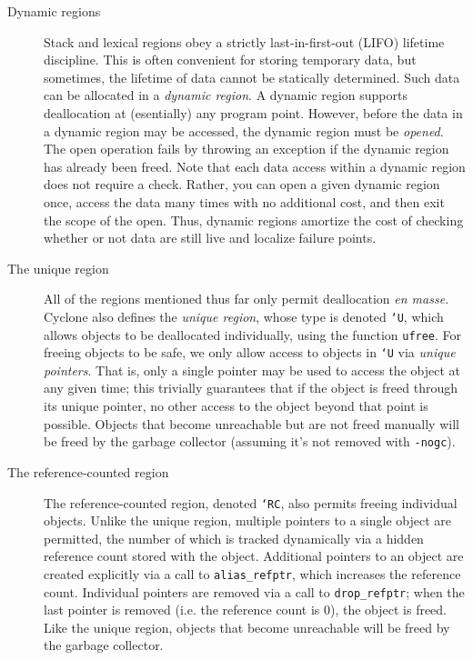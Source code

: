 \begin{description}
\item[Dynamic regions]  Stack and lexical regions obey a strictly
  last-in-first-out (LIFO) lifetime discipline.  This is often
  convenient for storing temporary data, but sometimes, the lifetime
  of data cannot be statically determined.  Such data can be allocated
  in a \emph{dynamic region}.  A dynamic region supports deallocation
  at (esentially) any program point.  However, before the data in a
  dynamic region may be accessed, the dynamic region must be \emph{opened}.
  The open operation fails by throwing an exception if the dynamic
  region has already been freed.  Note that each data access within
  a dynamic region does not require a check.  Rather, you can open
  a given dynamic region once, access the data many times with no
  additional cost, and then exit the scope of the open.  Thus, 
  dynamic regions amortize the cost of checking whether or not data
  are still live and localize failure points.  

\item[The unique region] All of the regions mentioned thus far only permit
  deallocation \emph{en masse.}  Cyclone also defines the \emph{unique
  region}, whose type is denoted \texttt{`U}, which allows objects to be
  deallocated individually, using the function \texttt{ufree}.  For freeing
  objects to be safe, we only allow access to objects in \texttt{`U} via
  \emph{unique pointers}.  That is, only a single pointer may be used to
  access the object at any given time; this trivially guarantees that if the
  object is freed through its unique pointer, no other access to the object
  beyond that point is possible.  Objects that become unreachable but are
  not freed manually will be freed by the garbage collector (assuming it's
  not removed with \texttt{-nogc}).

\item[The reference-counted region] The reference-counted region, denoted
  \texttt{`RC}, also permits freeing individual objects.  Unlike the unique
  region, multiple pointers to a single object are permitted, the number of
  which is tracked dynamically via a hidden reference count stored with the
  object.  Additional pointers to an object are created explicitly via a
  call to \texttt{alias\_refptr}, which increases the reference count.
  Individual pointers are removed via a call to \texttt{drop\_refptr}; when
  the last pointer is removed (i.e. the reference count is 0), the object is
  freed.  Like the unique region, objects that become unreachable will be
  freed by the garbage collector.
\end{description}


